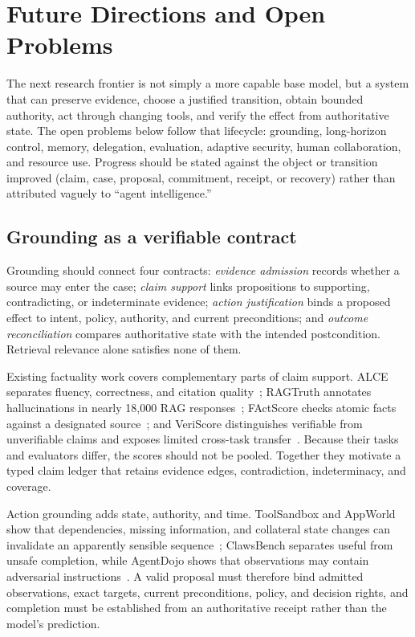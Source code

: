 \section{Future Directions and Open Problems}
\label{sec:future}

The next research frontier is not simply a more capable base model, but a system that can preserve evidence, choose a justified transition, obtain bounded authority, act through changing tools, and verify the effect from authoritative state. The open problems below follow that lifecycle: grounding, long-horizon control, memory, delegation, evaluation, adaptive security, human collaboration, and resource use. Progress should be stated against the object or transition improved (claim, case, proposal, commitment, receipt, or recovery) rather than attributed vaguely to ``agent intelligence.''

\subsection{Grounding as a verifiable contract}

Grounding should connect four contracts: \emph{evidence admission} records whether a source may enter the case; \emph{claim support} links propositions to supporting, contradicting, or indeterminate evidence; \emph{action justification} binds a proposed effect to intent, policy, authority, and current preconditions; and \emph{outcome reconciliation} compares authoritative state with the intended postcondition. Retrieval relevance alone satisfies none of them.

Existing factuality work covers complementary parts of claim support. ALCE separates fluency, correctness, and citation quality~\cite{gao2023alce}; RAGTruth annotates hallucinations in nearly 18,000 RAG responses~\cite{niu2024ragtruth}; FActScore checks atomic facts against a designated source~\cite{min2023factscore}; and VeriScore distinguishes verifiable from unverifiable claims and exposes limited cross-task transfer~\cite{song2024veriscore}. Because their tasks and evaluators differ, the scores should not be pooled. Together they motivate a typed claim ledger that retains evidence edges, contradiction, indeterminacy, and coverage.

Action grounding adds state, authority, and time. ToolSandbox and AppWorld show that dependencies, missing information, and collateral state changes can invalidate an apparently sensible sequence~\cite{lu2025toolsandbox,trivedi2024appworld}; ClawsBench separates useful from unsafe completion, while AgentDojo shows that observations may contain adversarial instructions~\cite{li2026clawsbench,debenedetti2024agentdojo}. A valid proposal must therefore bind admitted observations, exact targets, current preconditions, policy, and decision rights, and completion must be established from an authoritative receipt rather than the model's prediction.

